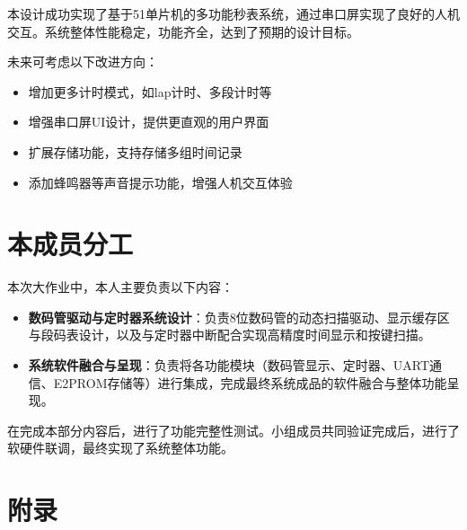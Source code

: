 \documentclass[12pt,hyperref,a4paper,UTF8]{ctexart}
\begin{document}
本设计成功实现了基于51单片机的多功能秒表系统，通过串口屏实现了良好的人机交互。系统整体性能稳定，功能齐全，达到了预期的设计目标。

未来可考虑以下改进方向：
\begin{itemize}
  \item 增加更多计时模式，如lap计时、多段计时等
  \item 增强串口屏UI设计，提供更直观的用户界面
  \item 扩展存储功能，支持存储多组时间记录
  \item 添加蜂鸣器等声音提示功能，增强人机交互体验
\end{itemize}

\section{本成员分工}

本次大作业中，本人主要负责以下内容：

\begin{itemize}
  \item \textbf{数码管驱动与定时器系统设计}：负责8位数码管的动态扫描驱动、显示缓存区与段码表设计，以及与定时器中断配合实现高精度时间显示和按键扫描。
  \item \textbf{系统软件融合与呈现}：负责将各功能模块（数码管显示、定时器、UART通信、E2PROM存储等）进行集成，完成最终系统成品的软件融合与整体功能呈现。
\end{itemize}

在完成本部分内容后，进行了功能完整性测试。小组成员共同验证完成后，进行了软硬件联调，最终实现了系统整体功能。

\section*{附录}
\end{document}
